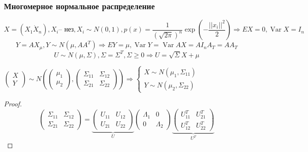 \documentclass{article}
\DeclareMathOperator{\Var}{Var}
\begin{document}
    \subsubsection{Многомерное нормальное распределение}
    \begin{example}
        $$X = (X_1 \dot X_n), X_i \text{-- нез}, X_i \sim N(0, 1),         p(x)=\frac1{(\sqrt{2\pi})^n}\exp\left(-\frac{||x_i||^2}2\right) \Rightarrow EX=0, \Var X = I_n$$
        $$ Y = AX _ \mu, Y \sim N(\mu, AA^T) \Rightarrow EY = \mu, \Var Y = \Var AX = AI_nA_T = AA_T$$
        $$ U \sim N(\mu, \Sigma), \Sigma = \Sigma^T, \Sigma \ge 0 \Rightarrow U = \sqrt{\Sigma} X + \mu$$
    \end{example}
    \begin{claim}
        $\begin{pmatrix}
            X \\ Y
        \end{pmatrix} \sim N(\begin{pmatrix}
            \mu_1 \\ \mu_2
        \end{pmatrix}, \begin{pmatrix}
        \Sigma_{11} & \Sigma_{12}\\
        \Sigma_{21} & \Sigma_{22}
        \end{pmatrix}) \Rightarrow \begin{cases}
            X \sim N(\mu_1, \Sigma_11) \\
            Y \sim N(\mu_2, \Sigma_22)
        \end{cases}$
        \begin{proof}
            $$ \begin{pmatrix}
        \Sigma_{11} & \Sigma_{12}\\
        \Sigma_{21} & \Sigma_{22}
        \end{pmatrix} = \underbrace{\begin{pmatrix}
        U_{11} & U_{12}\\
        U_{21} & U_{22}
        \end{pmatrix}}_U \begin{pmatrix}
        \Lambda_{1} & 0\\
        0 & \Lambda_{2}
        \end{pmatrix} \underbrace{\begin{pmatrix}
         U_{11}^T & U_{21}^T\\
        U_{12}^T & U_{22}^T
        \end{pmatrix}}_{U^T}$$

\end{proof}
\end{claim}
\end{document}
